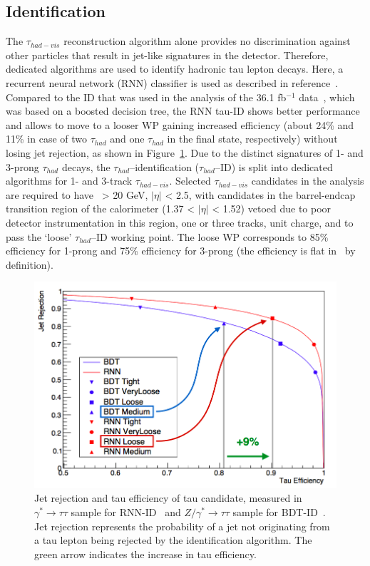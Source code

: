 \subsection{Identification}
The $\tau_{had-vis}$ reconstruction algorithm alone provides 
no discrimination against other particles that result in
jet-like signatures in the detector. 
Therefore, dedicated algorithms are used to identify hadronic tau lepton
decays. Here, a recurrent neural network (RNN) classifier 
is used as described in reference~\cite{ATL-PHYS-PUB-2019-033}.
Compared to the ID that was used in the analysis of the 36.1 fb$^{-1}$ data~\cite{HIGG-2016-16},
which was based on a boosted decision tree, 
the RNN tau-ID shows better performance 
and allows to move to a looser WP gaining increased efficiency 
(about 24\% and 11\% in case of two $\tau_{had}$ and 
one $\tau_{had}$ in the final state, respectively) 
without losing jet rejection, as shown in Figure~\ref{fig:RNNtau}. 
Due to the distinct signatures of 1- and 3-prong $\tau_{had}$ decays, 
the $\tau_{had}$--identification ($\tau_{had}$--ID) is split into dedicated
algorithms for 1- and 3-track $\tau_{had-vis}$.
Selected $\tau_{had-vis}$ candidates in the analysis are required to have 
\pt\ > 20 GeV, $|\eta|$ < 2.5, with candidates in the barrel-endcap 
transition region of the calorimeter (1.37 < $|\eta|$ < 1.52) vetoed 
due to poor detector instrumentation in this region, 
one or three tracks, unit charge, and to pass the ‘loose’ $\tau_{had}$--ID working point.
The loose WP corresponds to 85\% efficiency for 1-prong 
and 75\% efficiency for 3-prong (the efficiency is
flat in \pt\ by definition).
\begin{figure}[bth]
	\begin{centering}	
	\includegraphics[width=.9\textwidth]{Reconstruction_plots/tauRNN.png}
	\caption{Jet rejection and tau efficiency of tau candidate, 
    measured in $\gamma^* \rightarrow \tau\tau$ sample for RNN-ID~\cite{ATL-PHYS-PUB-2019-033}
    and $Z/\gamma^* \rightarrow \tau\tau$ sample for BDT-ID~\cite{ATL-PHYS-PUB-2015-045}.
    Jet rejection represents the probability of a jet 
    not originating from a tau lepton being rejected 
    by the identification algorithm.
    The green arrow indicates the increase in tau efficiency.}
	\label{fig:RNNtau}
	\end{centering}
\end{figure}

